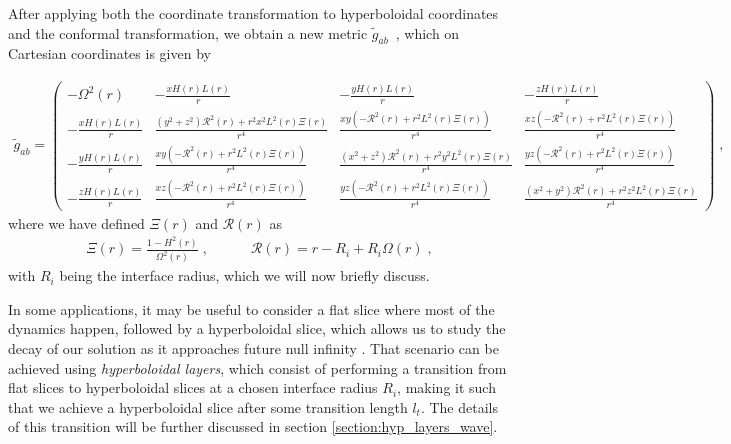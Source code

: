 After applying both the coordinate transformation to hyperboloidal coordinates and the conformal transformation, we obtain a new metric $\tilde{g}_{ab}$~, which on Cartesian coordinates is given by

\begin{align}
    \tilde{g}_{ab} = 
    \begin{pmatrix}
        -\Omega^2(r) & -\frac{x H(r) L(r)}{r} & -\frac{y H(r) L(r)}{r} & -\frac{z H(r) L(r)}{r} \\
        -\frac{x H(r) L(r)}{r} & \frac{(y^2 + z^2) \mathcal{R}^2(r) + r^2 x^2 L^2(r) \Xi(r)}{r^4} & \frac{x y (-\mathcal{R}^2(r) + r^2 L^2(r) \Xi(r))}{r^4} & \frac{x z (-\mathcal{R}^2(r) + r^2 L^2(r) \Xi(r))}{r^4} \\
        -\frac{y H(r) L(r)}{r} & \frac{x y (-\mathcal{R}^2(r) + r^2 L^2(r) \Xi(r))}{r^4} & \frac{(x^2 + z^2) \mathcal{R}^2(r) + r^2 y^2 L^2(r) \Xi(r)}{r^4} & \frac{y z (-\mathcal{R}^2(r) + r^2 L^2(r) \Xi(r))}{r^4} \\
        -\frac{z H(r) L(r)}{r} & \frac{x z (-\mathcal{R}^2(r) + r^2 L^2(r) \Xi(r))}{r^4} & \frac{y z (-\mathcal{R}^2(r) + r^2 L^2(r) \Xi(r))}{r^4} & \frac{(x^2 + y^2) \mathcal{R}^2(r) + r^2 z^2 L^2(r) \Xi(r)}{r^4}
    \end{pmatrix} \; ,
\end{align}
%
where we have defined $\Xi(r)$ and $\mathcal{R}(r)$ as
%
\begin{align}
    \Xi(r) = \frac{1 - H^2(r)}{\Omega^2(r)} \; , \quad \quad \quad \mathcal{R}(r) = r - R_i + R_i \Omega(r) \; ,
\end{align}
%
with $R_i$ being the interface radius, which we will now briefly discuss.

In some applications, it may be useful to consider a flat slice where most of the dynamics happen, followed by a hyperboloidal slice, which allows us to study the decay of our solution as it approaches future null infinity \cite{Hyperboloidal_layers_for_hyperbolic_equations_on_unbounded_domains,The_evolution_of_hyperboloidal_data_with_the_dual_foliation_formalism_Mathematical_analysis_and_wave_equation_tests}. That scenario can be achieved using \textit{hyperboloidal layers}, which consist of performing a transition from flat slices to hyperboloidal slices at a chosen interface radius $R_i$, making it such that we achieve a hyperboloidal slice after some transition length $l_t$. The details of this transition will be further discussed in section \ref{section:hyp_layers_wave}.


